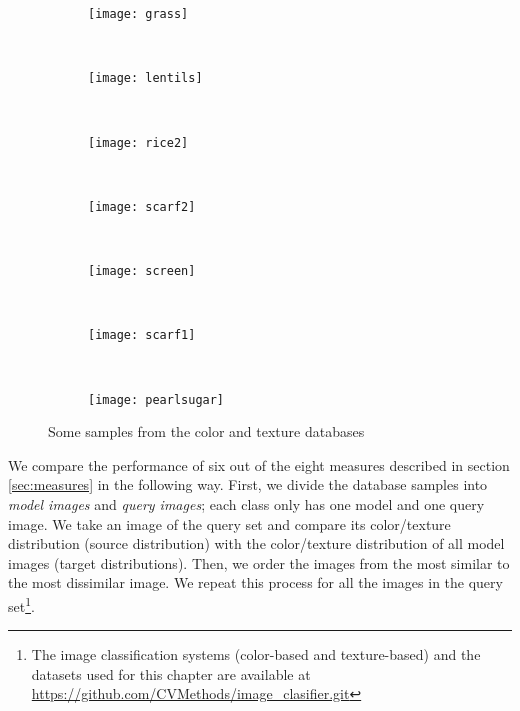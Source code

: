 \begin{figure}[!ht]
        
    \begin{subfigure}[b]{0.12\textwidth}
		\centering
		\texttt{[image: grass]}	
	\end{subfigure}
	~ %
    \begin{subfigure}[b]{0.12\textwidth}
		\centering
		\texttt{[image: lentils]}	
	\end{subfigure}
    ~ %
    \begin{subfigure}[b]{0.12\textwidth}
		\centering
		\texttt{[image: rice2]}	
	\end{subfigure}
	~ %
    \begin{subfigure}[b]{0.12\textwidth}
		\centering
		\texttt{[image: scarf2]}	
	\end{subfigure}
    ~ %
    \begin{subfigure}[b]{0.12\textwidth}
		\centering
		\texttt{[image: screen]}	
	\end{subfigure}
    ~ %
    \begin{subfigure}[b]{0.12\textwidth}
		\centering
		\texttt{[image: scarf1]}	
	\end{subfigure}
    ~ %
    \begin{subfigure}[b]{0.12\textwidth}
		\centering
		\texttt{[image: pearlsugar]}	
	\end{subfigure}
		
    \caption{Some samples from the color and texture databases}
    \label{fig:databases}
\end{figure}

We compare the performance of six out of the eight measures described in section \ref{sec:measures} in the following way. First, we divide the database samples into \textit{model images} and \textit{query images}; each class only has one model and one query image. We take an image of the query set and compare its color/texture distribution (source distribution) with the color/texture distribution of all model images (target distributions). Then, we order the images from the most similar to the most dissimilar image. We repeat this process for all the images in the query set\footnote{The image classification systems (color-based and texture-based) and the datasets used for this chapter are available at \url{https://github.com/CVMethods/image_clasifier.git}}.
 
